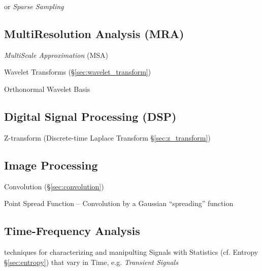 or \emph{Sparse Sampling}



\subsection{MultiResolution Analysis (MRA)}\label{sec:multiresolution_analysis}

\emph{MultiScale Approximation} (MSA)

Wavelet Transforms (\S\ref{sec:wavelet_transform})

Orthonormal Wavelet Basis



\subsection{Digital Signal Processing (DSP)}\label{sec:dsp}

\fist Z-transform (Discrete-time Laplace Transform \S\ref{sec:z_transform})



\subsection{Image Processing}\label{sec:image_processing}

Convolution (\S\ref{sec:convolution})

Point Spread Function -- Convolution by a Gaussian ``spreading'' function



\subsection{Time-Frequency Analysis}\label{sec:time_frequency_analysis}

techniques for characterizing and manipulting Signals with Statistics (cf.
Entropy \S\ref{sec:entropy}) that vary in Time, e.g. \emph{Transient Signals}


